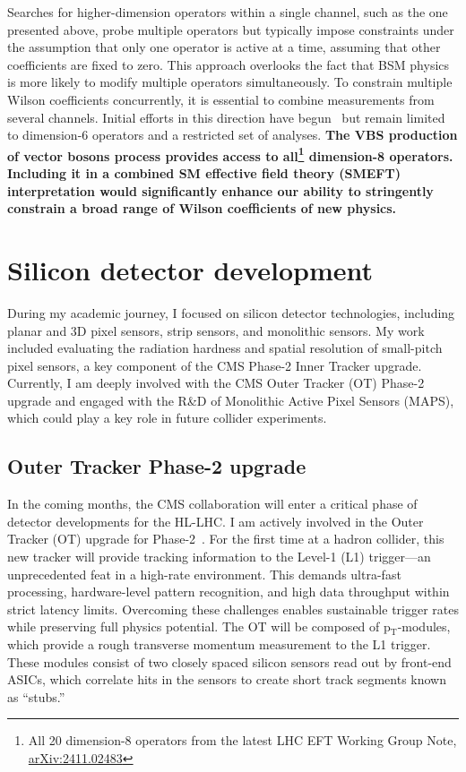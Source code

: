 {\begin{flushleft}
Searches for higher-dimension operators within a single channel, such as the one presented above, probe multiple operators but typically impose constraints under the assumption that only one operator is active at a time, assuming that other coefficients are fixed to zero. This approach overlooks the fact that BSM physics is more likely to modify multiple operators simultaneously. To constrain multiple Wilson coefficients concurrently, it is essential to combine measurements from several channels. Initial efforts in this direction have begun~\cite{[6]} but remain limited to dimension-6 operators and a restricted set of analyses. {\bf The VBS production of vector bosons process provides access to all\footnote{All 20 dimension-8 operators from the latest LHC EFT Working Group Note, \href{https://arxiv.org/abs/2411.02483v1}{
arXiv:2411.02483}} dimension-8 operators. Including it in a combined SM effective field theory (SMEFT) interpretation would significantly enhance our ability to stringently constrain a broad range of Wilson coefficients of new physics.}



\vskip 4pt
\section{Silicon detector development}
During my academic journey, I focused on silicon detector technologies, including planar and 3D pixel sensors, strip sensors, and monolithic sensors. My work included evaluating the radiation hardness and spatial resolution of small-pitch pixel sensors, a key component of the CMS Phase-2 Inner Tracker upgrade. Currently, I am deeply involved with the CMS Outer Tracker  (OT) Phase-2 upgrade and engaged with the R\&D of Monolithic Active Pixel Sensors (MAPS), which could play a key role in future collider experiments.
\subsection{Outer Tracker Phase-2 upgrade}
In the coming months, the CMS collaboration will enter a critical phase of detector developments for the HL-LHC. I am actively involved in the Outer Tracker (OT) upgrade for Phase-2~\cite{[7]}. For the first time at a hadron collider, this new tracker will provide tracking information to the Level-1 (L1) trigger—an unprecedented feat in a high-rate environment. This demands ultra-fast processing, hardware-level pattern recognition, and high data throughput within strict latency limits. Overcoming these challenges enables sustainable trigger rates while preserving full physics potential. %
The OT will be composed of p$_{\mathrm{T}}$-modules, which provide a rough transverse momentum measurement to the L1 trigger. These modules consist of two closely spaced silicon sensors read out by front-end ASICs, which correlate hits in the sensors to create short track segments known as ``stubs.'' %


\end{flushleft}}
